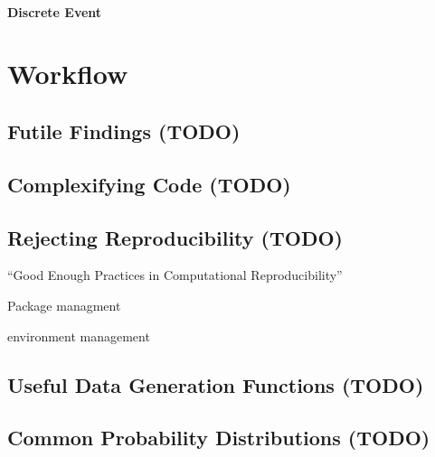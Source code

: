 \documentclass[
]{krantz}
\begin{document}
\hypertarget{discrete-event}{%
\subsection{Discrete Event}\label{discrete-event}}

\hypertarget{part-workflow}{%
\part*{Workflow}\label{part-workflow}}


\hypertarget{futi-find}{%
\chapter{Futile Findings (TODO)}\label{futi-find}}

\hypertarget{comp-code}{%
\chapter{Complexifying Code (TODO)}\label{comp-code}}

\hypertarget{reje-repr}{%
\chapter{Rejecting Reproducibility (TODO)}\label{reje-repr}}

``Good Enough Practices in Computational Reproducibility'' \citep{wilson_bryan_cranston_kitzes_nederbragt_teal_2017}

Package managment \citep{R-renv}

environment management

\cleardoublepage

\hypertarget{appendix-appendix}{%
\appendix {}}


\hypertarget{useful-data-generation-functions-todo}{%
\chapter{Useful Data Generation Functions (TODO)}\label{useful-data-generation-functions-todo}}

\hypertarget{common-probability-distributions-todo}{%
\chapter{Common Probability Distributions (TODO)}\label{common-probability-distributions-todo}}

  

\backmatter
\printindex
\end{document}

